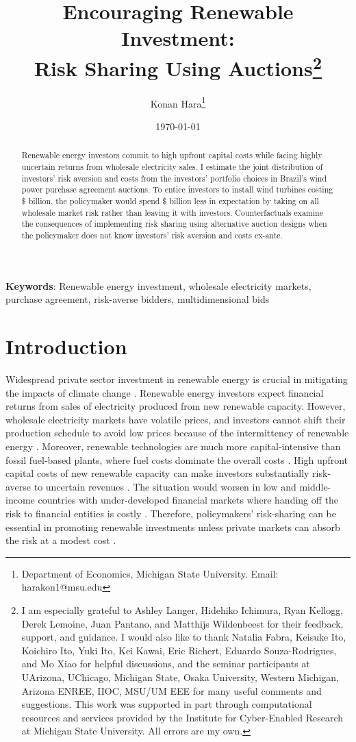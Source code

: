 \documentclass[12pt]{article}
\title{Encouraging Renewable Investment:\\Risk Sharing Using Auctions\thanks{
I am especially grateful to Ashley Langer, Hidehiko Ichimura, Ryan Kellogg, Derek Lemoine, Juan Pantano, and Matthijs Wildenbeest for their feedback, support, and guidance. I would also like to thank Natalia Fabra, Keisuke Ito, Koichiro Ito, Yuki Ito, Kei Kawai, Eric Richert, Eduardo Souza-Rodrigues, and Mo Xiao for helpful discussions, and the seminar participants at UArizona, UChicago, Michigan State, Osaka University, Western Michigan, Arizona ENREE, IIOC, MSU/UM EEE for many useful comments and suggestions.
This work was supported in part through computational resources and services provided by the Institute for Cyber-Enabled Research at Michigan State University.
All errors are my own.
}}
\author{Konan Hara\footnote{Department of Economics, Michigan State University. Email: harakon1@msu.edu}}
\date{\today}
\theoremstyle{definition} %
\begin{document}
\maketitle

\begin{abstract}
\onehalfspacing
Renewable energy investors commit to high upfront capital costs while facing highly uncertain returns from wholesale electricity sales. I estimate the joint distribution of investors' risk aversion and costs from the investors' portfolio choices in Brazil's wind power purchase agreement auctions. To entice investors to install wind turbines costing \$ billion, the policymaker would spend \$ billion less in expectation by taking on all wholesale market risk rather than leaving it with investors. Counterfactuals examine the consequences of implementing risk sharing using alternative auction designs when the policymaker does not know investors' risk aversion and costs ex-ante.
\end{abstract}

\noindent \textbf{Keywords}: Renewable energy investment, wholesale electricity markets, purchase agreement, risk-averse bidders, multidimensional bids


\clearpage

\section{Introduction}

Widespread private sector investment in renewable energy is crucial in mitigating the impacts of climate change \citep{REN212023}. Renewable energy investors expect financial returns from sales of electricity produced from new renewable capacity. However, wholesale electricity markets have volatile prices, and investors cannot shift their production schedule to avoid low prices because of the intermittency of renewable energy \citep{Beiter2024}. Moreover, renewable technologies are much more capital-intensive than fossil fuel-based plants, where fuel costs dominate the overall costs \citep{Schmidt2014}. High upfront capital costs of new renewable capacity can make investors substantially risk-averse to uncertain revenues \citep{May2021}. The situation would worsen in low and middle-income countries with under-developed financial markets where handing off the risk to financial entities is costly \citep{Ameli2021,Calcaterra2024}. Therefore, policymakers' risk-sharing can be essential in promoting renewable investments unless private markets can absorb the risk at a modest cost \citep{Schmidt2014,Beiter2024}.
\end{document}
